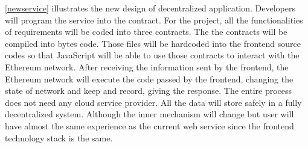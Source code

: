 \documentclass[openany,12pt]{ecsthesis}      %
\begin{document}
\ref{newservice} illustrates the new design of decentralized application. Developers will program the service into the contract. 
For the project, all the functionalities of requirements will be coded into three contracts. The the contracts will be compiled into bytes code. 
Those files will be hardcoded into the frontend source codes so that JavaScript will be able to use those contracts to interact with the Ethereum network.
After receiving the information sent by the frontend, the Ethereum network will execute the code passed by the frontend, 
changing the state of network and keep and record, 
giving the response. The entire process does not need any cloud service provider. 
All the data will store safely in a fully decentralized system. 
Although the inner mechanism will change 
but user will have almost the same experience as the current web service 
since the frontend technology stack is the same.
\end{document}
